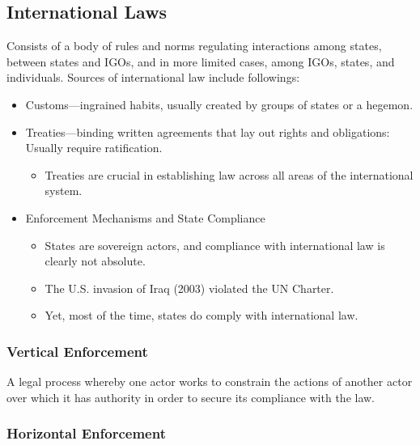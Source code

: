 \documentclass[
]{book}
\providecommand{\tightlist}{%
  \setlength{\itemsep}{0pt}\setlength{\parskip}{0pt}}
\begin{document}
\hypertarget{international-laws}{%
\subsection{International Laws}\label{international-laws}}

Consists of a body of rules and norms regulating interactions among states, between states and IGOs, and in more limited cases, among IGOs, states, and individuals. Sources of international law include followings:

\begin{itemize}
\item
  Customs---ingrained habits, usually created by groups of states or a hegemon.
\item
  Treaties---binding written agreements that lay out rights and obligations: Usually require ratification.

  \begin{itemize}
  \tightlist
  \item
    Treaties are crucial in establishing law across all areas of the international system.
  \end{itemize}
\item
  Enforcement Mechanisms and State Compliance

  \begin{itemize}
  \item
    States are sovereign actors, and compliance with international law is clearly not absolute.
  \item
    The U.S. invasion of Iraq (2003) violated the UN Charter.
  \item
    Yet, most of the time, states do comply with international law.
  \end{itemize}
\end{itemize}

\hypertarget{vertical-enforcement}{%
\subsubsection{Vertical Enforcement}\label{vertical-enforcement}}

A legal process whereby one actor works to constrain the actions of another actor over which it has authority in order to secure its compliance with the law.

\hypertarget{horizontal-enforcement}{%
\subsubsection{Horizontal Enforcement}\label{horizontal-enforcement}}
\end{document}
